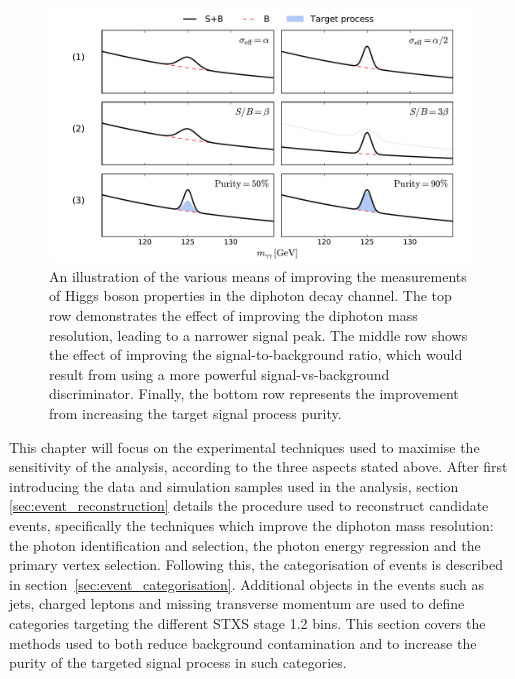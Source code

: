 \begin{figure}[htb]
  \centering
  \includegraphics[width=1\textwidth]{Figures/hgg_overview/hgg_improve_measurement.pdf}
  \caption[Avenues for improving \Hgg measurements.]
  {
    An illustration of the various means of improving the measurements of Higgs boson properties in the diphoton decay channel. The top row demonstrates the effect of improving the diphoton mass resolution, leading to a narrower signal peak. The middle row shows the effect of improving the signal-to-background ratio, which would result from using a more powerful signal-vs-background discriminator. Finally, the bottom row represents the improvement from increasing the target signal process purity.
  }
  \label{fig:hgg_overview_improving_measurements}
\end{figure}

This chapter will focus on the experimental techniques used to maximise the sensitivity of the analysis, according to the three aspects stated above. After first introducing the data and simulation samples used in the analysis, section \ref{sec:event_reconstruction} details the procedure used to reconstruct candidate \Hgg events, specifically the techniques which improve the diphoton mass resolution: the photon identification and selection, the photon energy regression and the primary vertex selection. Following this, the categorisation of events is described in section~\ref{sec:event_categorisation}. Additional objects in the events such as jets, charged leptons and missing transverse momentum are used to define categories targeting the different STXS stage 1.2 bins. This section covers the methods used to both reduce background contamination and to increase the purity of the targeted signal process in such categories.







